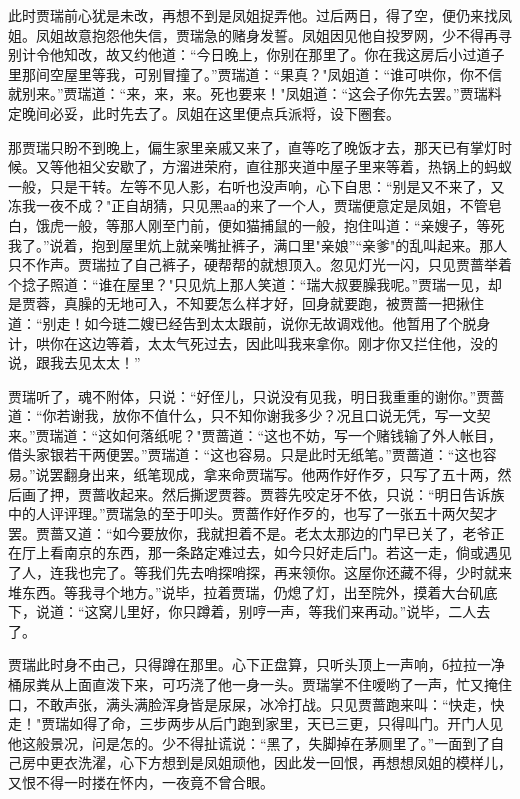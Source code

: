此时贾瑞前心犹是未改，再想不到是凤姐捉弄他。过后两日，得了空，便仍来找凤姐。凤姐故意抱怨他失信，贾瑞急的赌身发誓。凤姐因见他自投罗网，少不得再寻别计令他知改，故又约他道：“今日晚上，你别在那里了。你在我这房后小过道子里那间空屋里等我，可别冒撞了。”贾瑞道：“果真？"凤姐道：“谁可哄你，你不信就别来。”贾瑞道：“来，来，来。死也要来！"凤姐道：“这会子你先去罢。”贾瑞料定晚间必妥，此时先去了。凤姐在这里便点兵派将，设下圈套。

那贾瑞只盼不到晚上，偏生家里亲戚又来了，直等吃了晚饭才去，那天已有掌灯时候。又等他祖父安歇了，方溜进荣府，直往那夹道中屋子里来等着，热锅上的蚂蚁一般，只是干转。左等不见人影，右听也没声响，心下自思：“别是又不来了，又冻我一夜不成？"正自胡猜，只见黑аа的来了一个人，贾瑞便意定是凤姐，不管皂白，饿虎一般，等那人刚至门前，便如猫捕鼠的一般，抱住叫道：“亲嫂子，等死我了。”说着，抱到屋里炕上就亲嘴扯裤子，满口里"亲娘”“亲爹"的乱叫起来。那人只不作声。贾瑞拉了自己裤子，硬帮帮的就想顶入。忽见灯光一闪，只见贾蔷举着个捻子照道：“谁在屋里？"只见炕上那人笑道：“瑞大叔要臊我呢。”贾瑞一见，却是贾蓉，真臊的无地可入，不知要怎么样才好，回身就要跑，被贾蔷一把揪住道：“别走！如今琏二嫂已经告到太太跟前，说你无故调戏他。他暂用了个脱身计，哄你在这边等着，太太气死过去，因此叫我来拿你。刚才你又拦住他，没的说，跟我去见太太！”

贾瑞听了，魂不附体，只说：“好侄儿，只说没有见我，明日我重重的谢你。”贾蔷道：“你若谢我，放你不值什么，只不知你谢我多少？况且口说无凭，写一文契来。”贾瑞道：“这如何落纸呢？"贾蔷道：“这也不妨，写一个赌钱输了外人帐目，借头家银若干两便罢。”贾瑞道：“这也容易。只是此时无纸笔。”贾蔷道：“这也容易。”说罢翻身出来，纸笔现成，拿来命贾瑞写。他两作好作歹，只写了五十两，然后画了押，贾蔷收起来。然后撕逻贾蓉。贾蓉先咬定牙不依，只说：“明日告诉族中的人评评理。”贾瑞急的至于叩头。贾蔷作好作歹的，也写了一张五十两欠契才罢。贾蔷又道：“如今要放你，我就担着不是。老太太那边的门早已关了，老爷正在厅上看南京的东西，那一条路定难过去，如今只好走后门。若这一走，倘或遇见了人，连我也完了。等我们先去哨探哨探，再来领你。这屋你还藏不得，少时就来堆东西。等我寻个地方。”说毕，拉着贾瑞，仍熄了灯，出至院外，摸着大台矶底下，说道：“这窝儿里好，你只蹲着，别哼一声，等我们来再动。”说毕，二人去了。

贾瑞此时身不由己，只得蹲在那里。心下正盘算，只听头顶上一声响，б拉拉一净桶尿粪从上面直泼下来，可巧浇了他一身一头。贾瑞掌不住嗳哟了一声，忙又掩住口，不敢声张，满头满脸浑身皆是尿屎，冰冷打战。只见贾蔷跑来叫：“快走，快走！"贾瑞如得了命，三步两步从后门跑到家里，天已三更，只得叫门。开门人见他这般景况，问是怎的。少不得扯谎说：“黑了，失脚掉在茅厕里了。”一面到了自己房中更衣洗濯，心下方想到是凤姐顽他，因此发一回恨，再想想凤姐的模样儿，又恨不得一时搂在怀内，一夜竟不曾合眼。

